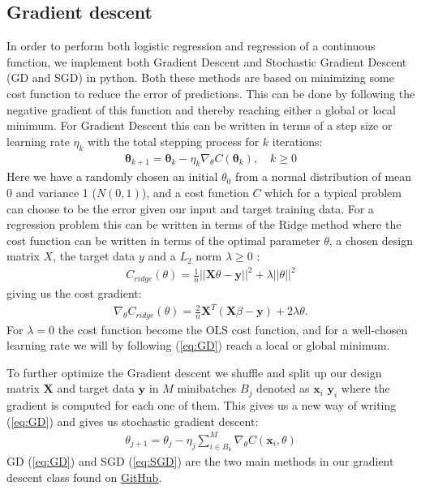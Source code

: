 \documentclass[11pt]{article}
\begin{document}
\subsection{Gradient descent}\label{sec:GD}
In order to perform both logistic regression and regression of a continuous function, we implement both Gradient Descent and Stochastic Gradient Descent (GD and SGD) in python. Both these methods are based on minimizing some cost function to reduce the error of predictions. This can be done by following the negative gradient of this function and thereby reaching either a global or local minimum. For Gradient Descent this can be written in terms of a step size or learning rate $\eta_k$ with the total stepping process for $k$ iterations:
\begin{align}
    \label{eq:GD}
    \boldsymbol{\theta}_{k+1} = \boldsymbol{\theta}_k - \eta_k \nabla_\theta C(\boldsymbol{\theta}_k),\quad k \geq 0
\end{align}
Here we have a randomly chosen an initial $\theta_0$ from a normal distribution of mean 0 and variance 1 ($N(0,1)$), and a cost function $C$ which for a typical problem can choose to be the error given our input and target training data. For a regression problem this can be written in terms of the Ridge method where the cost function can be written in terms of the optimal parameter $\theta$, a chosen design matrix $X$, the target data $y$ and a $L_2$ norm $\lambda \geq 0$ :
\begin{align*}
    C_{ridge}(\theta) = \frac{1 }{n }||\boldsymbol{X}\theta - \boldsymbol{y}||^2 + \lambda ||\theta||^2
\end{align*}
giving us the cost gradient:
\begin{align*}
    \nabla_\theta C_{ridge}(\theta) = \frac{2}{n}\boldsymbol{X}^T(\boldsymbol{X}\beta - \boldsymbol{y}) + 2\lambda \theta.
\end{align*}
For $\lambda=0$ the cost function become the OLS cost function, and for a well-chosen learning rate we will by following (\ref{eq:GD}) reach a local or global minimum.

To further optimize the Gradient descent we shuffle and split up our design matrix $\boldsymbol{X}$ and target data $\boldsymbol{y}$ in $M$ minibatches $B_j$ denoted as $\boldsymbol{x}_i$ $\boldsymbol{y}_i$ where the gradient is computed for each one of them. This gives us a new way of writing (\ref{eq:GD}) and gives us stochastic gradient descent:
\begin{align}
    \label{eq:SGD}
    \theta_{j+1} = \theta_j - \eta_j \sum_{i\in B_k}^M \nabla_\theta C(\boldsymbol{x}_i, \theta)
\end{align}
GD (\ref{eq:GD}) and SGD (\ref{eq:SGD}) are the two main methods in our gradient descent class found on \href{https://github.com/Fslippe/FYS-STK4155/tree/main/project2}{GitHub}.
\end{document}
